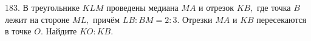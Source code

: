 183. В треугольнике $KLM$ проведены медиана $MA$ и отрезок $KB,$ где точка $B$ лежит на стороне $ML,$ причём $LB:BM=2:3.$ Отрезки $MA$ и $KB$ пересекаются в точке $O.$ Найдите $KO:KB.$\\
